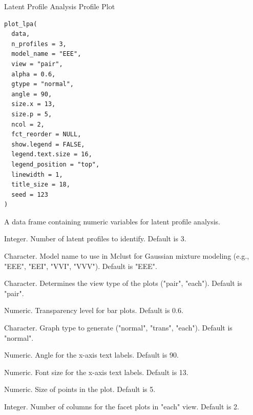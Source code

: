 \documentclass[a4paper]{book}
\begin{document}
%
\begin{Description}
Latent Profile Analysis Profile Plot
\end{Description}
%
\begin{Usage}
\begin{verbatim}
plot_lpa(
  data,
  n_profiles = 3,
  model_name = "EEE",
  view = "pair",
  alpha = 0.6,
  gtype = "normal",
  angle = 90,
  size.x = 13,
  size.p = 5,
  ncol = 2,
  fct_reorder = NULL,
  show.legend = FALSE,
  legend.text.size = 16,
  legend_position = "top",
  linewidth = 1,
  title_size = 18,
  seed = 123
)
\end{verbatim}
\end{Usage}
%
\begin{Arguments}
\begin{ldescription}
\item[\code{data}] A data frame containing numeric variables for latent profile analysis.

\item[\code{n\_profiles}] Integer. Number of latent profiles to identify. Default is 3.

\item[\code{model\_name}] Character. Model name to use in Mclust for Gaussian mixture modeling (e.g., "EEE", "EEI", "VVI", "VVV"). Default is "EEE".

\item[\code{view}] Character. Determines the view type of the plots ("pair", "each"). Default is "pair".

\item[\code{alpha}] Numeric. Transparency level for bar plots. Default is 0.6.

\item[\code{gtype}] Character. Graph type to generate ("normal", "trans", "each"). Default is "normal".

\item[\code{angle}] Numeric. Angle for the x-axis text labels. Default is 90.

\item[\code{size.x}] Numeric. Font size for the x-axis text labels. Default is 13.

\item[\code{size.p}] Numeric. Size of points in the plot. Default is 5.

\item[\code{ncol}] Integer. Number of columns for the facet plots in "each" view. Default is 2.


\end{ldescription}
\end{Arguments}
\end{document}
